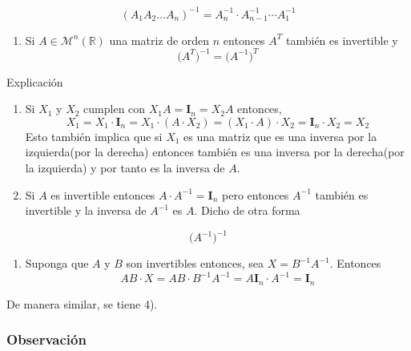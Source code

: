 \documentclass[
]{article}
\providecommand{\tightlist}{%
  \setlength{\itemsep}{0pt}\setlength{\parskip}{0pt}}
\begin{document}
\begin{equation}
 (A_1A_2\ldots A_n)^{-1} = A_n^{-1}\cdot A_{n-1}^{-1}\cdots A_1^{-1}
\end{equation}

\begin{enumerate}
\def\labelenumi{\arabic{enumi})}
\setcounter{enumi}{4}
\tightlist
\item
  Si \(A\in\mathcal{M}^{n}(\mathbb{R})\) una matriz de orden \(n\)
  entonces \(A^{T}\) también es invertible y \begin{equation}
  \big(A^{T}\big)^{-1} = \big(A^{-1}\big)^{T}
  \end{equation}
\end{enumerate}

Explicación

\begin{enumerate}
\def\labelenumi{\arabic{enumi})}
\item
  Si \(X_1\) y \(X_2\) cumplen con \(X_1A = \mathbf{I}_n=X_2A\)
  entonces, \[
  X_1 = X_1\cdot \mathbf{I}_n = X_1\cdot(A\cdot X_2) = (X_1\cdot A)\cdot X_2 = \mathbf{I}_n\cdot X_2 = X_2 
  \] Esto también implica que si \(X_1\) es una matriz que es una
  inversa por la izquierda(por la derecha) entonces también es una
  inversa por la derecha(por la izquierda) y por tanto es la inversa de
  \(A\).
\item
  Si \(A\) es invertible entonces \(A\cdot A^{-1} = \mathbf{I}_n\) pero
  entonces \(A^{-1}\) también es invertible y la inversa de \(A^{-1}\)
  es \(A\). Dicho de otra forma
\end{enumerate}

\begin{equation}
 \big( A^{-1} \big)^{-1}
\end{equation}

\begin{enumerate}
\def\labelenumi{\arabic{enumi})}
\setcounter{enumi}{2}
\tightlist
\item
  Suponga que \(A\) y \(B\) son invertibles entonces, sea
  \(X=B^{-1}A^{-1}\). Entonces \[
  AB\cdot X=AB\cdot B^{-1}A^{-1} = A\mathbf{I}_n\cdot A^{-1} = \mathbf{I}_n 
  \]
\end{enumerate}

De manera similar, se tiene 4).

\hypertarget{observaciuxf3n-1}{%
\subsubsection{Observación}\label{observaciuxf3n-1}}
\end{document}
